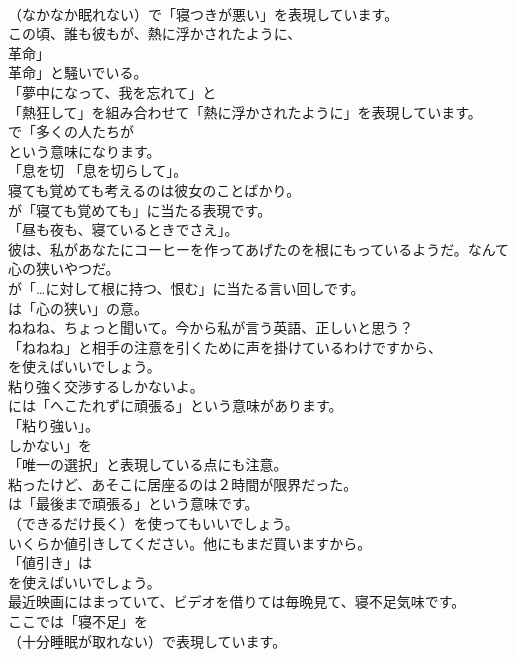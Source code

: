 \documentclass[8pt]{extreport}
\begin{document}
\begin{CJK}{UTF8}{min}
\\	（なかなか眠れない）で「寝つきが悪い」を表現しています。	
\\	この頃、誰も彼もが、熱に浮かされたように、
\\	革命」
\\	革命」と騒いでいる。 
\\	「夢中になって、我を忘れて」と
\\	「熱狂して」を組み合わせて「熱に浮かされたように」を表現しています。
\\	で「多くの人たちが
\\	という意味になります。
\\	「息を切 「息を切らして」。	
\\	寝ても覚めても考えるのは彼女のことばかり。 
\\	が「寝ても覚めても」に当たる表現です。
\\	「昼も夜も、寝ているときでさえ」。	
\\	彼は、私があなたにコーヒーを作ってあげたのを根にもっているようだ。なんて心の狭いやつだ。 
\\	が「…に対して根に持つ、恨む」に当たる言い回しです。
\\	は「心の狭い」の意。	
\\	ねねね、ちょっと聞いて。今から私が言う英語、正しいと思う？ 
\\	「ねねね」と相手の注意を引くために声を掛けているわけですから、
\\	を使えばいいでしょう。	
\\	粘り強く交渉するしかないよ。 
\\	には「へこたれずに頑張る」という意味があります。
\\	「粘り強い」。
\\	しかない」を
\\	「唯一の選択」と表現している点にも注意。	
\\	粘ったけど、あそこに居座るのは２時間が限界だった。 
\\	は「最後まで頑張る」という意味です。
\\	（できるだけ長く）を使ってもいいでしょう。	
\\	いくらか値引きしてください。他にもまだ買いますから。 
\\	「値引き」は
\\	を使えばいいでしょう。	
\\	最近映画にはまっていて、ビデオを借りては毎晩見て、寝不足気味です。 
\\	ここでは「寝不足」を 
\\	（十分睡眠が取れない）で表現しています。

\end{CJK}
\end{document}
